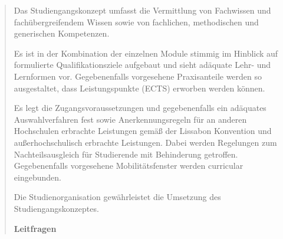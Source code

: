 \begin{quote}
Das Studiengangskonzept umfasst die Vermittlung von Fachwissen und
fachübergreifendem Wissen sowie von fachlichen, methodischen und
generischen Kompetenzen.

Es ist in der Kombination der einzelnen Module stimmig im Hinblick auf
formulierte Qualifikationsziele aufgebaut und sieht adäquate Lehr- und
Lernformen vor. Gegebenenfalls vorgesehene Praxisanteile werden so
ausgestaltet, dass Leistungspunkte (ECTS) erworben werden können.

Es legt die Zugangsvoraussetzungen und gegebenenfalls ein adäquates
Auswahlverfahren fest sowie Anerkennungsregeln für an anderen
Hochschulen erbrachte Leistungen gemäß der Lissabon Konvention und
außerhochschulisch erbrachte Leistungen. Dabei werden Regelungen zum
Nachteilsausgleich für Studierende mit Behinderung getroffen.
Gegebenenfalls vorgesehene Mobilitätsfenster werden curricular
eingebunden.

Die Studienorganisation gewährleistet die Umsetzung des
Studiengangskonzeptes.

\textbf{Leitfragen}


\end{quote}
